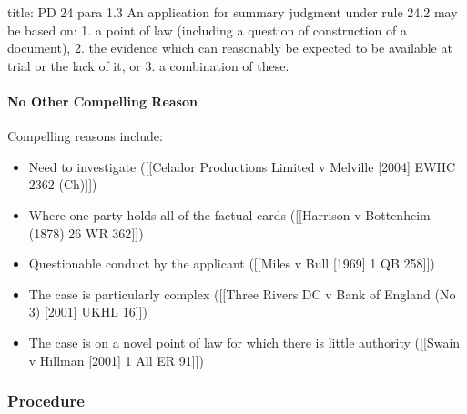 \documentclass[
]{article}
\newenvironment{Shaded}{}{}
\newcommand{\NormalTok}[1]{#1}
\providecommand{\tightlist}{%
  \setlength{\itemsep}{0pt}\setlength{\parskip}{0pt}}
\begin{document}
\begin{Shaded}
\begin{Highlighting}[]
\NormalTok{title: PD 24 para 1.3}
\NormalTok{An application for summary judgment under rule 24.2 may be based on:}
\NormalTok{1. a point of law (including a question of construction of a document),}
\NormalTok{2. the evidence which can reasonably be expected to be available at trial or the lack of it, or}
\NormalTok{3. a combination of these.}
\end{Highlighting}
\end{Shaded}

\hypertarget{no-other-compelling-reason}{%
\paragraph{No Other Compelling
Reason}\label{no-other-compelling-reason}}

Compelling reasons include:

\begin{itemize}
\tightlist
\item
  Need to investigate ({[}{[}Celador Productions Limited v Melville
  {[}2004{]} EWHC 2362 (Ch){]}{]})
\item
  Where one party holds all of the factual cards ({[}{[}Harrison v
  Bottenheim (1878) 26 WR 362{]}{]})
\item
  Questionable conduct by the applicant ({[}{[}Miles v Bull {[}1969{]} 1
  QB 258{]}{]})
\item
  The case is particularly complex ({[}{[}Three Rivers DC v Bank of
  England (No 3) {[}2001{]} UKHL 16{]}{]})
\item
  The case is on a novel point of law for which there is little
  authority ({[}{[}Swain v Hillman {[}2001{]} 1 All ER 91{]}{]})
\end{itemize}

\hypertarget{procedure}{%
\subsubsection{Procedure}\label{procedure}}
\end{document}
